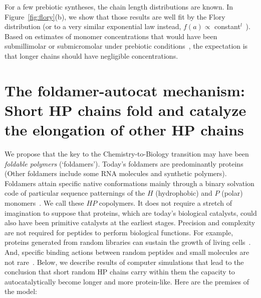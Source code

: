 \documentclass[5p,times]{elsarticle}
\begin{document}
For a few prebiotic syntheses, the chain length distributions are known.  In 
Figure~\ref{fig:flory}(b), we show that those results are well fit by the Flory distribution (or 
to a very similar exponential law instead, 
$f(a)\propto$ constant$^l$~\cite{nowak2008prevolutionary,Derr2012}).  Based on estimates of monomer 
concentrations that would have been submillimolar or submicromolar under prebiotic 
conditions~\cite{Stribling1987,Huber1998,Aubrey2009,Kanavarioti2001,Lazcano1996}, the expectation is 
that longer chains should have negligible concentrations. %


\section{The foldamer-autocat mechanism: Short HP chains fold and catalyze the elongation of other 
HP chains}

 We propose that the key to the Chemistry-to-Biology transition may have been \emph{foldable 
polymers} (`foldamers').  Today's foldamers are predominantly proteins (Other foldamers include 
some RNA molecules and synthetic polymers\cite{Lee2005a}). Foldamers attain specific native 
conformations mainly through a binary solvation code of particular sequence patternings of the $H$ 
(hydrophobic) and $P$ (polar) monomers~\cite{Chan1991}.  We call these $HP$ copolymers.  It does not 
require a stretch of imagination to suppose that proteins, which are today's biological catalysts, 
could also have been primitive catalysts at the earliest stages.  Precision and complexity are not 
required for peptides to perform biological functions.  For example, proteins generated from random 
libraries can sustain the growth of living cells~\cite{Fisher2011}.  And, specific binding actions 
between random peptides and small molecules are not rare~\cite{Cherny2012}.  Below, we describe 
results of computer simulations that lead to the conclusion that short random HP chains carry within 
them the capacity to autocatalytically become longer and more protein-like.  Here are the premises 
of the model:
 
\end{document}
